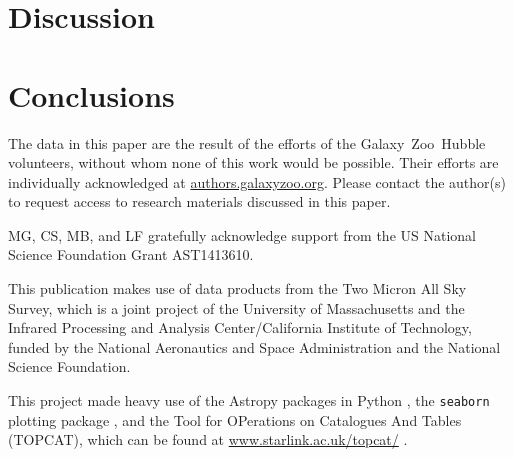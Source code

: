\documentclass[useAMS,usenatbib]{mn2e}
\begin{document}


\section{Discussion}\label{sec:Discussion}
%
%
\section{Conclusions}
\label{sec:conclusions}



The data in this paper are the result of the efforts of the Galaxy~Zoo~Hubble volunteers, without whom none of this work would be possible. Their efforts are individually acknowledged at \url{authors.galaxyzoo.org}. Please contact the author(s) to request access to research materials discussed in this paper. 


MG, CS, MB, and LF gratefully acknowledge support from the US National
Science Foundation Grant AST1413610.

This publication makes use of data products from the Two Micron All Sky Survey, which is a joint project of the University of Massachusetts and the Infrared Processing and Analysis Center/California Institute of Technology, funded by the National Aeronautics and Space Administration and the National Science Foundation.

This project made heavy use of the Astropy packages in Python \citep{Robitaille2013}, the \texttt{seaborn} plotting package \citep{Waskom}, and the Tool for OPerations on Catalogues And Tables (TOPCAT), which can be found at \url{www.starlink.ac.uk/topcat/} \citep{topcat2011}. 
\end{document}
